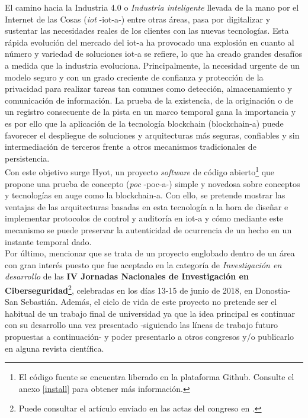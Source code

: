 \documentclass[12pt,a4paper, twoside]{report}
\begin{document}
	El camino hacia la Industria 4.0 o \textit{Industria inteligente} llevada de la mano por el Internet de las Cosas (\textit{\gls{iot}} -\gls{iot-a}-) entre otras áreas, pasa por digitalizar y sustentar las necesidades reales de los clientes con las nuevas tecnologías. Esta rápida evolución del mercado del \gls{iot-a} ha provocado una explosión en cuanto al número y variedad de soluciones \gls{iot-a} se refiere, lo que ha creado grandes desafíos a medida que la industria evoluciona. Principalmente, la necesidad urgente de un modelo seguro y con un grado creciente de confianza y protección de la privacidad para realizar tareas tan comunes como detección, almacenamiento y comunicación de información. La prueba de la existencia, de la originación o de un registro consecuente de la pista en un marco temporal gana la importancia y es por ello que la aplicación de la tecnología \Gls{blockchain} (\gls{blockchain-a}) puede favorecer el despliegue de soluciones y arquitecturas más seguras, confiables y sin intermediación de terceros frente a otros mecanismos tradicionales de persistencia. \\
	
	Con este objetivo surge Hyot, un proyecto \textit{software} de código abierto\footnote{El código fuente se encuentra liberado en la plataforma Github. Consulte el anexo \ref{install} para obtener más información.} que propone una prueba de concepto (\textit{\gls{poc}} -\gls{poc-a}-) simple y novedosa sobre conceptos y tecnologías en auge como la \gls{blockchain-a}. Con ello, se pretende mostrar las ventajas de las arquitecturas basadas en esta tecnología a la hora de diseñar e implementar protocolos de control y auditoría en \gls{iot-a} y cómo mediante este mecanismo se puede preservar la autenticidad de ocurrencia de un hecho en un instante temporal dado. \\
	
	Por último, mencionar que se trata de un proyecto englobado dentro de un área con gran interés puesto que fue aceptado en la categoría de \textit{Investigación en desarrollo} de las \textbf{IV Jornadas Nacionales de Investigación en Ciberseguridad}\footnote{Puede consultar el artículo enviado en las actas del congreso en \cite{jnic2018}.}, celebradas en los días 13-15 de junio de 2018, en Donostia-San Sebastián. Además, el ciclo de vida de este proyecto no pretende ser el habitual de un trabajo final de universidad ya que la idea principal es continuar con su desarrollo una vez presentado -siguiendo las líneas de trabajo futuro propuestas a continuación- y poder presentarlo a otros congresos y/o publicarlo en alguna revista científica. \\
				
\end{document}
